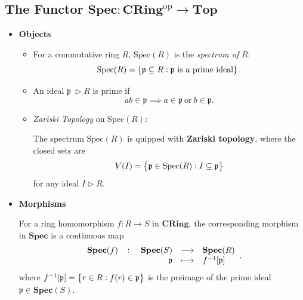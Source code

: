 \documentclass[11pt,openany]{article}
\begin{document}
\subsection*{The Functor $\mathbf{Spec}:\mathbf{CRing}^{\text{op}}\to\mathbf{Top}$}
\begin{itemize}
	\item \textbf{Objects}
	\begin{itemize}
		\item For a commutative ring $R$, $\text{Spec}(R)$ is the \textit{spectrum of} $R$: \[
		\text{Spec}(R)=\set{\mathfrak{p}\subseteq R:\mathfrak{p}\ \text{is a prime ideal}}.
		\]
		\item An ideal $\mathfrak{p}\ \rhd R$ is prime if \[
		ab\in\mathfrak{p}\implies a\in\mathfrak{p}\ \text{or}\ b\in\mathfrak{p}.
		\]
		\item \textit{Zariski Topology} on $\text{Spec}(R)$:
		
		The spectrum $\text{Spec}(R)$ is quipped with \textbf{Zariski topology}, where the closed sets are \[
		V(I)=\set{\mathfrak{p}\in\text{Spec}(R): I\subseteq\mathfrak{p}}
		\] for any ideal $I\rhd R$.
	\end{itemize}
	\item \textbf{Morphisms}
	
	For a ring homomorphism $f:R\to S$ in $\mathbf{CRing}$, the corresponding morphism in $\mathbf{Spec}$ is a continuous map \[
	\fullfunction{\mathbf{Spec}(f)}{\mathbf{Spec}(S)}{\mathbf{Spec}(R)}{\mathfrak{p}}{f^{-1}[\mathfrak{p}]},
	\] where $f^{-1}[\mathfrak{p}]=\set{r\in R: f(r)\in\mathfrak{p}}$ is the preimage of the prime ideal $\mathfrak{p}\in\mathbf{Spec}(S)$.
\end{itemize}
\vspace{40pt}
\end{document}

